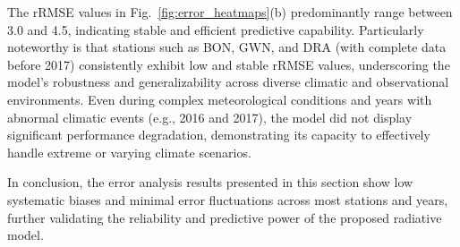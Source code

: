 \documentclass[preprint,12pt]{elsarticle}
\begin{document}
The rRMSE values in Fig.~\ref{fig:error_heatmaps}(b) predominantly range between 3.0 and 4.5, indicating stable and efficient predictive capability. Particularly noteworthy is that stations such as BON, GWN, and DRA (with complete data before 2017) consistently exhibit low and stable rRMSE values, underscoring the model's robustness and generalizability across diverse climatic and observational environments. Even during complex meteorological conditions and years with abnormal climatic events (e.g., 2016 and 2017), the model did not display significant performance degradation, demonstrating its capacity to effectively handle extreme or varying climate scenarios.

In conclusion, the error analysis results presented in this section show low systematic biases and minimal error fluctuations across most stations and years, further validating the reliability and predictive power of the proposed radiative model. 




\end{document}

